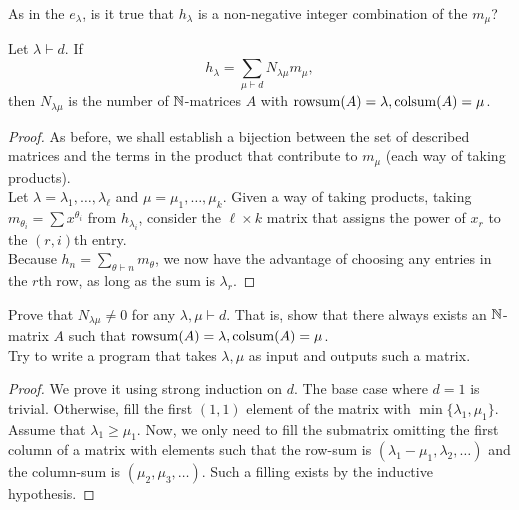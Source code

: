 	As in the $e_\lambda$, is it true that $h_\lambda$ is a non-negative integer combination of the $m_\mu$?
	\begin{flem}
		Let $\lambda \vdash d$. If
		\[ h_\lambda = \sum_{\mu \vdash d} N_{\lambda\mu} m_\mu, \]
		then $N_{\lambda\mu}$ is the number of $\mathbb{N}$-matrices $A$ with $\operatorname{rowsum}(A) = \lambda, \operatorname{colsum}(A) = \mu$.
	\end{flem}
	\begin{proof}
		As before, we shall establish a bijection between the set of described matrices and the terms in the product that contribute to $m_\mu$ (each way of taking products).\\
		Let $\lambda = \lambda_1,\ldots,\lambda_\ell$ and $\mu = \mu_1,\ldots,\mu_k$. Given a way of taking products, taking $m_{\theta_i} = \sum x^{\theta_i}$ from $h_{\lambda_i}$, consider the $\ell \times k$ matrix that assigns the power of $x_r$ to the $(r,i)$th entry.\\ 
		Because $h_n = \sum_{\theta \vdash n} m_\theta$, we now have the advantage of choosing any entries in the $r$th row, as long as the sum is $\lambda_r$.
	\end{proof}


	\begin{prop}
		Prove that $N_{\lambda\mu} \ne 0$ for any $\lambda,\mu \vdash d$. That is, show that there always exists an $\mathbb{N}$-matrix $A$ such that $\operatorname{rowsum}(A) = \lambda,\operatorname{colsum}(A) = \mu$.\\
		Try to write a program that takes $\lambda,\mu$ as input and outputs such a matrix.
	\end{prop}
	\begin{proof}
		We prove it using strong induction on $d$. The base case where $d = 1$ is trivial. Otherwise, fill the first $(1,1)$ element of the matrix with $\min\{\lambda_1,\mu_1\}$. Assume that $\lambda_1 \ge \mu_1$. Now, we only need to fill the submatrix omitting the first column of a matrix with elements such that the row-sum is $(\lambda_1-\mu_1,\lambda_2,\ldots)$ and the column-sum is $(\mu_2,\mu_3,\ldots)$. Such a filling exists by the inductive hypothesis.
	\end{proof}

